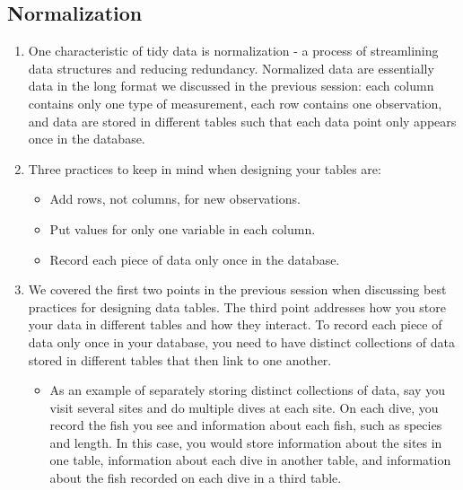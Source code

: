 \documentclass[
]{book}
\providecommand{\tightlist}{%
  \setlength{\itemsep}{0pt}\setlength{\parskip}{0pt}}
\begin{document}
\hypertarget{normalization}{%
\subsection{Normalization}\label{normalization}}

\begin{enumerate}
\def\labelenumi{\arabic{enumi}.}
\item
  One characteristic of tidy data is normalization - a process of streamlining data structures and reducing redundancy. Normalized data are essentially data in the long format we discussed in the previous session: each column contains only one type of measurement, each row contains one observation, and data are stored in different tables such that each data point only appears once in the database.
\item
  Three practices to keep in mind when designing your tables are:

  \begin{itemize}
  \item
    Add rows, not columns, for new observations.
  \item
    Put values for only one variable in each column.
  \item
    Record each piece of data only once in the database.
  \end{itemize}
\item
  We covered the first two points in the previous session when discussing best practices for designing data tables. The third point addresses how you store your data in different tables and how they interact. To record each piece of data only once in your database, you need to have distinct collections of data stored in different tables that then link to one another.

  \begin{itemize}
  \tightlist
  \item
    As an example of separately storing distinct collections of data, say you visit several sites and do multiple dives at each site. On each dive, you record the fish you see and information about each fish, such as species and length. In this case, you would store information about the sites in one table, information about each dive in another table, and information about the fish recorded on each dive in a third table.


\end{itemize}
\end{enumerate}
\end{document}
